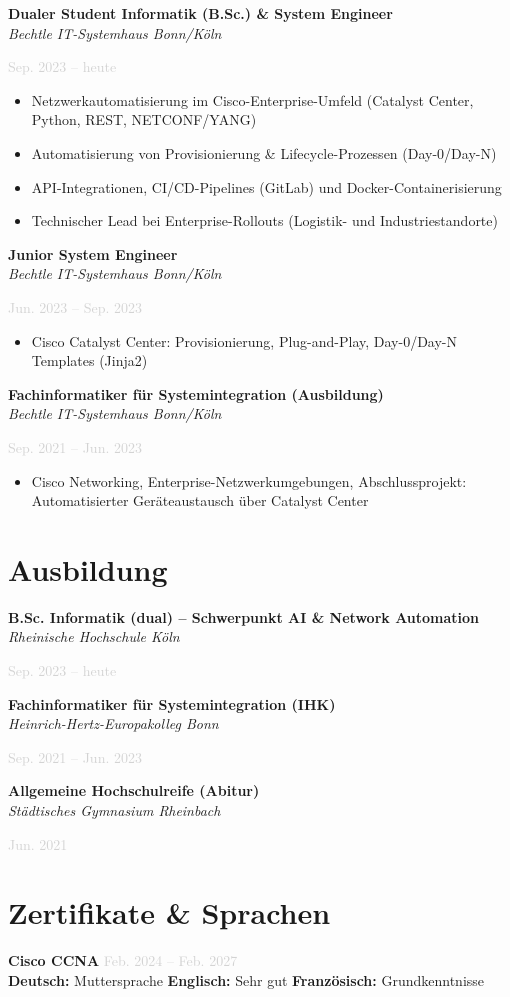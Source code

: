 \documentclass[11pt,a4paper]{article}
\newcommand{\cventry}[3]{
    \noindent
    \begin{minipage}[t]{0.75\textwidth}
        \textbf{#1}\\
        \textit{\small #2}
    \end{minipage}
    \hfill
    \begin{minipage}[t]{0.23\textwidth}
        \raggedleft\textcolor{lightgray}{\small #3}
    \end{minipage}
    \par\vspace{6pt}
}
\newcommand{\cveducation}[3]{
    \noindent
    \begin{minipage}[t]{0.75\textwidth}
        \textbf{#1}\\
        \textit{\small #2}
    \end{minipage}
    \hfill
    \begin{minipage}[t]{0.23\textwidth}
        \raggedleft\textcolor{lightgray}{\small #3}
    \end{minipage}
    \par\vspace{6pt}
}
\begin{document}
\cventry{Dualer Student Informatik (B.Sc.) \& System Engineer}{Bechtle IT-Systemhaus Bonn/Köln}{Sep. 2023 – heute}
\begin{itemize}
    \item Netzwerkautomatisierung im Cisco-Enterprise-Umfeld (Catalyst Center, Python, REST, NETCONF/YANG)
    \item Automatisierung von Provisionierung \& Lifecycle-Prozessen (Day-0/Day-N)
    \item API-Integrationen, CI/CD-Pipelines (GitLab) und Docker-Containerisierung
    \item Technischer Lead bei Enterprise-Rollouts (Logistik- und Industriestandorte)
\end{itemize}
\vspace{4pt}

\cventry{Junior System Engineer}{Bechtle IT-Systemhaus Bonn/Köln}{Jun. 2023 – Sep. 2023}
\begin{itemize}
    \item Cisco Catalyst Center: Provisionierung, Plug-and-Play, Day-0/Day-N Templates (Jinja2)
\end{itemize}
\vspace{4pt}

\cventry{Fachinformatiker für Systemintegration (Ausbildung)}{Bechtle IT-Systemhaus Bonn/Köln}{Sep. 2021 – Jun. 2023}
\begin{itemize}
    \item Cisco Networking, Enterprise-Netzwerkumgebungen, Abschlussprojekt: Automatisierter Geräteaustausch über Catalyst Center
\end{itemize}

\vspace{4pt}

\section*{Ausbildung}

\cveducation{B.Sc. Informatik (dual) – Schwerpunkt AI \& Network Automation}{Rheinische Hochschule Köln}{Sep. 2023 – heute}
\cveducation{Fachinformatiker für Systemintegration (IHK)}{Heinrich-Hertz-Europakolleg Bonn}{Sep. 2021 – Jun. 2023}
\cveducation{Allgemeine Hochschulreife (Abitur)}{Städtisches Gymnasium Rheinbach}{Jun. 2021}

\vspace{4pt}

\section*{Zertifikate \& Sprachen}
\noindent
\textbf{Cisco CCNA} \hfill \textcolor{lightgray}{\small Feb. 2024 – Feb. 2027}\\[4pt]
\textbf{Deutsch:} Muttersprache \quad \textbf{Englisch:} Sehr gut \quad \textbf{Französisch:} Grundkenntnisse
\end{document}
